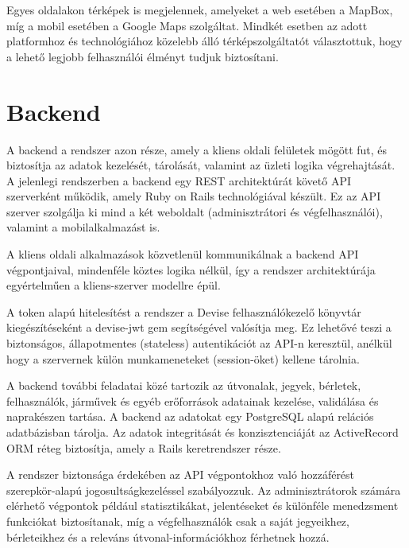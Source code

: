 Egyes oldalakon térképek is megjelennek, amelyeket a web esetében a MapBox, míg a mobil esetében a Google Maps szolgáltat. Mindkét esetben az adott platformhoz és technológiához közelebb álló térképszolgáltatót választottuk, hogy a lehető legjobb felhasználói élményt tudjuk biztosítani.

\section{Backend}
A backend a rendszer azon része, amely a kliens oldali felületek mögött fut, és biztosítja az adatok kezelését, tárolását, valamint az üzleti logika végrehajtását. A jelenlegi rendszerben a backend egy REST architektúrát követő API szerverként működik, amely Ruby on Rails technológiával készült. Ez az API szerver szolgálja ki mind a két weboldalt (adminisztrátori és végfelhasználói), valamint a mobilalkalmazást is.

A kliens oldali alkalmazások közvetlenül kommunikálnak a backend API végpontjaival, mindenféle köztes logika nélkül, így a rendszer architektúrája egyértelműen a kliens-szerver modellre épül.

A token alapú hitelesítést a rendszer a Devise felhasználókezelő könyvtár kiegészítéseként a devise-jwt gem segítségével valósítja meg. Ez lehetővé teszi a biztonságos, állapotmentes (stateless) autentikációt az API-n keresztül, anélkül hogy a szervernek külön munkameneteket (session-öket) kellene tárolnia.

A backend további feladatai közé tartozik az útvonalak, jegyek, bérletek, felhasználók, járművek és egyéb erőforrások adatainak kezelése, validálása és naprakészen tartása. A backend az adatokat egy PostgreSQL alapú relációs adatbázisban tárolja. Az adatok integritását és konzisztenciáját az ActiveRecord ORM réteg biztosítja, amely a Rails keretrendszer része.

A rendszer biztonsága érdekében az API végpontokhoz való hozzáférést szerepkör-alapú jogosultságkezeléssel szabályozzuk. Az adminisztrátorok számára elérhető végpontok például statisztikákat, jelentéseket és különféle menedzsment funkciókat biztosítanak, míg a végfelhasználók csak a saját jegyeikhez, bérleteikhez és a releváns útvonal-információkhoz férhetnek hozzá.

